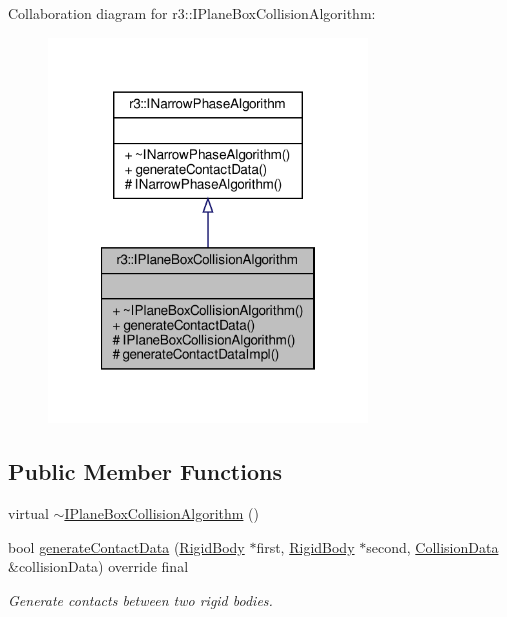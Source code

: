 Collaboration diagram for r3\+:\+:I\+Plane\+Box\+Collision\+Algorithm\+:\nopagebreak
\begin{figure}[H]
\begin{center}
\leavevmode
\includegraphics[width=240pt]{classr3_1_1_i_plane_box_collision_algorithm__coll__graph}
\end{center}
\end{figure}
\subsection*{Public Member Functions}
\begin{DoxyCompactItemize}
\item 
virtual \mbox{\hyperlink{classr3_1_1_i_plane_box_collision_algorithm_a1a1d1348a9e42970cfa770fa6017d4ed}{$\sim$\+I\+Plane\+Box\+Collision\+Algorithm}} ()
\item 
bool \mbox{\hyperlink{classr3_1_1_i_plane_box_collision_algorithm_aacbbfc59a3cb174876bd5cffad22f1fc}{generate\+Contact\+Data}} (\mbox{\hyperlink{classr3_1_1_rigid_body}{Rigid\+Body}} $\ast$first, \mbox{\hyperlink{classr3_1_1_rigid_body}{Rigid\+Body}} $\ast$second, \mbox{\hyperlink{classr3_1_1_collision_data}{Collision\+Data}} \&collision\+Data) override final
\begin{DoxyCompactList}\small\item\em Generate contacts between two rigid bodies. \end{DoxyCompactList}\end{DoxyCompactItemize}
